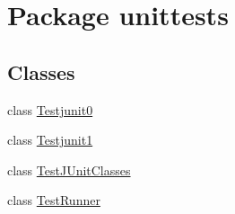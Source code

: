 \hypertarget{namespaceunittests}{}\section{Package unittests}
\label{namespaceunittests}
\subsection*{Classes}
\begin{DoxyCompactItemize}
\item 
class \hyperlink{classunittests_1_1_testjunit0}{Testjunit0}
\item 
class \hyperlink{classunittests_1_1_testjunit1}{Testjunit1}
\item 
class \hyperlink{classunittests_1_1_test_j_unit_classes}{Test\+J\+Unit\+Classes}
\item 
class \hyperlink{classunittests_1_1_test_runner}{Test\+Runner}
\end{DoxyCompactItemize}
